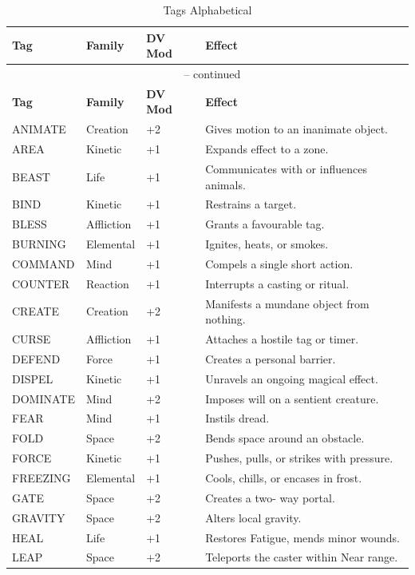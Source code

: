 \noindent
\begin{longtable}{p{} p{} p{} p{}}
\caption{Tags Alphabetical}\\
\midrule
\textbf{Tag} & \textbf{Family} & \textbf{DV Mod} & \textbf{Effect}\\
\midrule
\endfirsthead
\multicolumn{4}{c}{\tablename\ \thetable{} -- continued}\\
\midrule
\textbf{Tag} & \textbf{Family} & \textbf{DV Mod} & \textbf{Effect}\\
\midrule
\endhead
ANIMATE & Creation & +2 & Gives motion to an inanimate object. \\
AREA & Kinetic & +1 & Expands effect to a zone. \\
BEAST & Life & +1 & Communicates with or influences animals. \\
BIND & Kinetic & +1 & Restrains a target. \\
BLESS & Affliction & +1 & Grants a favourable tag. \\
BURNING & Elemental & +1 & Ignites, heats, or smokes. \\
COMMAND & Mind & +1 & Compels a single short action. \\
COUNTER & Reaction & +1 & Interrupts a casting or ritual. \\
CREATE & Creation & +2 & Manifests a mundane object from nothing. \\
CURSE & Affliction & +1 & Attaches a hostile tag or timer. \\
DEFEND & Force & +1 & Creates a personal barrier. \\
DISPEL & Kinetic & +1 & Unravels an ongoing magical effect. \\
DOMINATE & Mind & +2 & Imposes will on a sentient creature. \\
FEAR & Mind & +1 & Instils dread. \\
FOLD & Space & +2 & Bends space around an obstacle. \\
FORCE & Kinetic & +1 & Pushes, pulls, or strikes with pressure. \\
FREEZING & Elemental & +1 & Cools, chills, or encases in frost. \\
GATE & Space & +2 & Creates a two- way portal. \\
GRAVITY & Space & +2 & Alters local gravity. \\
HEAL & Life & +1 & Restores Fatigue, mends minor wounds. \\
LEAP & Space & +2 & Teleports the caster within Near range. \\

\end{longtable}
